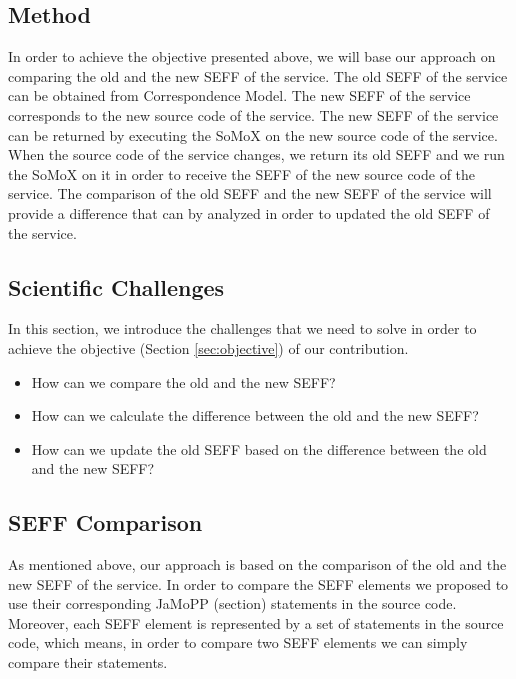 \subsection{Method}
\label{sec:Method}
In order to achieve the objective presented above, we will base our approach on comparing the old and the new SEFF of the service. The old SEFF of the service can be obtained from Correspondence Model. The new SEFF of the service corresponds to the new source code of the service. The new SEFF of the service can be returned by executing the SoMoX on the new source code of the service. \\

When the source code of the service changes, we return its old SEFF and we run the SoMoX on it in order to receive the SEFF of the new source code of the service. The comparison of the old SEFF and the new SEFF of the service will provide a difference that can by analyzed in order to updated the old SEFF of the service.  

\subsection{Scientific Challenges}
\label{sec:Scientific Challenges}
In this section, we introduce the challenges that we need to solve in order to achieve the objective (Section \ref{sec:objective}) of our contribution. 

\begin{itemize}
\item How can we compare the old and the new SEFF?
\item How can we calculate the difference between the old and the new SEFF?
\item How can we update the old SEFF based on the difference between the old and the new SEFF?
\end{itemize}


\subsection{SEFF Comparison}
\label{sec:SEFF Comparison}
As mentioned above, our approach is based on the comparison of the old and the new SEFF of the service. In order to compare the SEFF elements we proposed to use their corresponding JaMoPP (section) statements in the source code. Moreover, each SEFF element is represented by a set of statements in the source code, which means, in order to compare two SEFF elements we can simply compare their statements.\\

